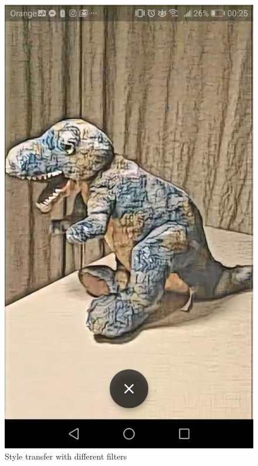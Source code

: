 \documentclass[../Main.tex]{subfiles}
\begin{document}
\begin{figure}[H]
        \includegraphics[width=\linewidth]{Images/app_photos/dino/salon.jpg}
    \endminipage\hfill
    \caption{Style transfer with different filters}\label{fig:gallery_options}
\end{figure}
\end{document}
